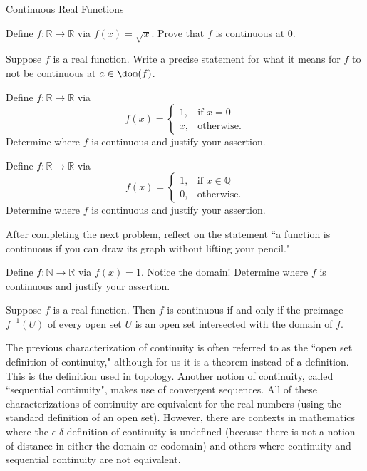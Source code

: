 \begin{section}{Continuous Real Functions}
\begin{problem}
Define $f:\mathbb{R}\to\mathbb{R}$ via $f(x)=\sqrt{x}$. Prove that $f$ is continuous at 0.
\end{problem}

\begin{problem}
Suppose $f$ is a real function. Write a precise statement for what it means for $f$ to not be continuous at $a\in\dom(f)$.
\end{problem}

\begin{problem}
Define $f:\mathbb{R}\to\mathbb{R}$ via 
\[
f(x)=\begin{cases}
1, & \text{if }x=0\\
x, & \text{otherwise}.
\end{cases}
\]
Determine where $f$ is continuous and justify your assertion.
\end{problem}

\begin{problem}
Define $f:\mathbb{R}\to\mathbb{R}$ via 
\[
f(x)=\begin{cases}
1, & \text{if }x\in \mathbb{Q}\\
0, & \text{otherwise}.
\end{cases}
\]
Determine where $f$ is continuous and justify your assertion.
\end{problem}

After completing the next problem, reflect on the statement ``a function is continuous if you can draw its graph without lifting your pencil."

\begin{problem}
Define $f:\mathbb{N}\to\mathbb{R}$ via $f(x)=1$. Notice the domain! Determine where $f$ is continuous and justify your assertion.
\end{problem}

\begin{theorem}\label{thm:inverse images open sets}
Suppose $f$ is a real function. Then $f$ is continuous if and only if the preimage $f^{-1}(U)$ of every open set $U$ is an open set intersected with the domain of $f$.
\end{theorem}

The previous characterization of continuity is often referred to as the ``open set definition of continuity," although for us it is a theorem instead of a definition. This is the definition used in topology. Another notion of continuity, called ``sequential continuity", makes use of convergent sequences.  All of these characterizations of continuity are equivalent for the real numbers (using the standard definition of an open set). However, there are contexts in mathematics where the $\epsilon$-$\delta$ definition of continuity is undefined (because there is not a notion of distance in either the domain or codomain) and others where continuity and sequential continuity are not equivalent.


\end{section}

